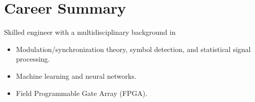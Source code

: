 \section{Career Summary}

Skilled engineer with a multidisciplinary background in
\begin{itemize}
    \item Modulation/synchronization theory, symbol detection, and statistical signal processing.
    \item Machine learning and neural networks.
    \item Field Programmable Gate Array (FPGA).
\end{itemize}